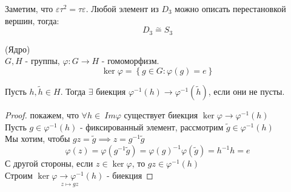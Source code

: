 \begin{examplelist}
\begin{center}
	\end{center}
	Заметим, что $\varepsilon\tau^2 = \tau\varepsilon$. Любой элемент из $D_3$ можно описать перестановкой вершин, тогда:
	\[
	D_3 \overset{\sim}{=} S_3
	\]
\end{examplelist}

\begin{definition}(Ядро) \\
	$G, H$ - группы, $\varphi: G \to H$ - гомоморфизм.
	\[
	\ker\varphi = \left\{g \in G: \varphi(g) = e\right\}
	\]
\end{definition}

\begin{stmt}
	Пусть $h, \widetilde{h} \in H$. Тогда $\exists$ биекция $\varphi^{-1}(h) \to \varphi^{-1}(\widetilde{h})$,
 если они не пусты.
	\begin{proof}
		покажем, что $\forall h \in \ Im\varphi$ существует биекция $\ker\varphi \to \varphi^{-1}(h)$ \\
		Пусть $g \in \varphi^{-1}(h)$ - фиксированный элемент, рассмотрим $\widetilde{g} \in \varphi^{-1}(h)$ \\
		Мы хотим, чтобы $gz = \widetilde{g} \implies z = g^{-1}\widetilde{g}$
		\[
		\varphi(z) = \varphi(g^{-1}\widetilde{g}) = \varphi(g)^{-1} \varphi(\widetilde{g}) = h^{-1}h = e
		\]
		С другой стороны, если $z \in \ker \varphi$, то $gz \in \varphi^{-1}(h)$\\
		Строим $\underset{z \mapsto gz}{\ker\varphi \to \varphi^{-1}(h)}$ - биекция
	\end{proof}
\end{stmt}


